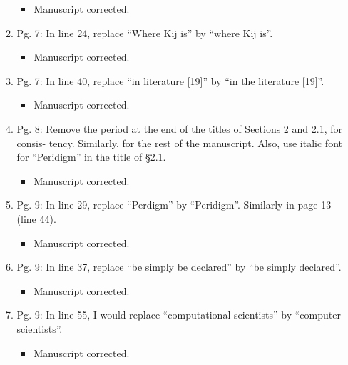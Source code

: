 \documentclass{article}
\begin{document}
\begin{enumerate}
\begin{enumerate}
{\color{red}  
\begin{itemize}
     \item
 Manuscript corrected. 
  \end{itemize}}

 \item Pg. 7: In line 24, replace “Where Kij is” by “where Kij is”.

{\color{red}  
\begin{itemize}
     \item
 Manuscript corrected. 
  \end{itemize}}

 \item Pg. 7: In line 40, replace “in literature [19]” by “in the literature [19]”.

{\color{red}  
\begin{itemize}
     \item
 Manuscript corrected. 
  \end{itemize}}

 \item Pg. 8: Remove the period at the end of the titles of Sections 2 and 2.1, for consis-
tency. Similarly, for the rest of the manuscript. Also, use italic font for “Peridigm” in
the title of §2.1.

{\color{red}  
\begin{itemize}
     \item
 Manuscript corrected. 
  \end{itemize}}

 \item Pg. 9: In line 29, replace “Perdigm” by “Peridigm”. Similarly in page 13 (line 44).

{\color{red}  
\begin{itemize}
     \item
 Manuscript corrected. 
  \end{itemize}}

 \item Pg. 9: In line 37, replace “be simply be declared” by “be simply declared”.

{\color{red}  
\begin{itemize}
     \item
 Manuscript corrected. 
  \end{itemize}}

 \item Pg. 9: In line 55, I would replace “computational scientists” by “computer scientists”.

{\color{red}  
\begin{itemize}
     \item
 Manuscript corrected. 
  \end{itemize}}


\end{enumerate}
\end{enumerate}
\end{document}
